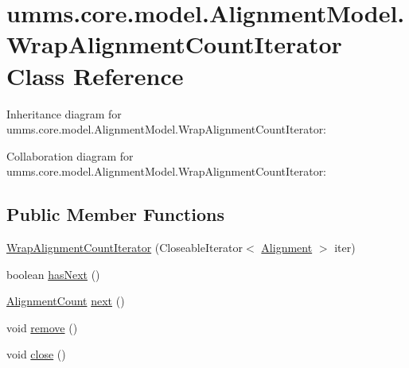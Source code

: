 \hypertarget{classumms_1_1core_1_1model_1_1_alignment_model_1_1_wrap_alignment_count_iterator}{\section{umms.\+core.\+model.\+Alignment\+Model.\+Wrap\+Alignment\+Count\+Iterator Class Reference}
\label{classumms_1_1core_1_1model_1_1_alignment_model_1_1_wrap_alignment_count_iterator}
}


Inheritance diagram for umms.\+core.\+model.\+Alignment\+Model.\+Wrap\+Alignment\+Count\+Iterator\+:


Collaboration diagram for umms.\+core.\+model.\+Alignment\+Model.\+Wrap\+Alignment\+Count\+Iterator\+:
\subsection*{Public Member Functions}
\begin{DoxyCompactItemize}
\item 
\hyperlink{classumms_1_1core_1_1model_1_1_alignment_model_1_1_wrap_alignment_count_iterator_a68deab5bacbbc4fd62f005f48c4e70d5}{Wrap\+Alignment\+Count\+Iterator} (Closeable\+Iterator$<$ \hyperlink{interfaceumms_1_1core_1_1alignment_1_1_alignment}{Alignment} $>$ iter)
\item 
boolean \hyperlink{classumms_1_1core_1_1model_1_1_alignment_model_1_1_wrap_alignment_count_iterator_a07b21ded21d77a7d5a0106f8ab58d41e}{has\+Next} ()
\item 
\hyperlink{classumms_1_1core_1_1model_1_1_alignment_model_1_1_alignment_count}{Alignment\+Count} \hyperlink{classumms_1_1core_1_1model_1_1_alignment_model_1_1_wrap_alignment_count_iterator_af279a4f6cf5e3e6b9eaa7dd046b4b223}{next} ()
\item 
void \hyperlink{classumms_1_1core_1_1model_1_1_alignment_model_1_1_wrap_alignment_count_iterator_aefe3838d1e5b16ca19447e15295dd774}{remove} ()
\item 
void \hyperlink{classumms_1_1core_1_1model_1_1_alignment_model_1_1_wrap_alignment_count_iterator_ade9d57988a39b3c0192c221425b04e8a}{close} ()
\end{DoxyCompactItemize}


